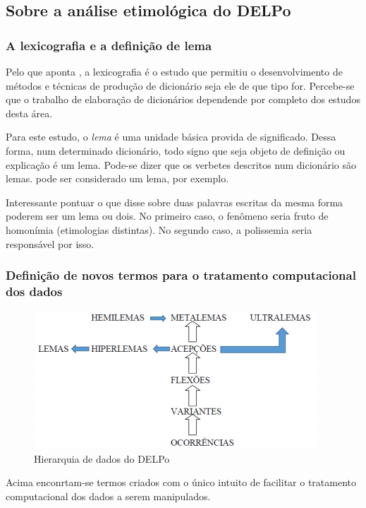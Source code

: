 \subsection{Sobre a análise etimológica do DELPo}
\label{subsec:analise-etimologica}

\subsubsection{A lexicografia e a definição de lema}
\label{subsubsec:lexicografia-lema}

Pelo que aponta \citep[p.~20]{Bar:14}, a lexicografia é o estudo que permitiu o
desenvolvimento de métodos e técnicas de produção de dicionário seja ele de que
tipo for. Percebe-se que o trabalho de elaboração de dicionários dependende por
completo dos estudos desta área.

Para este estudo, o \emph{lema} é uma unidade básica provida de significado.
Dessa forma, num determinado dicionário, todo signo que seja objeto de definição
ou explicação é um lema. Pode-se dizer que os verbetes descritos num dicionário
são lemas.  pode ser considerado um lema, por exemplo.

Interessante pontuar o que disse \citet[p.~146]{Mar:17} sobre duas palavras escritas
da mesma forma poderem ser um lema ou dois. No primeiro caso, o fenômeno seria
fruto de homonímia (etimologias distintas). No segundo caso, a polissemia seria
responsável por isso.

\subsubsection{Definição de novos termos para o tratamento computacional dos
dados}\label{subsubsec:tratamento-computacional-dos-dados}

\begin{figure}[ht]
    \centering
    \includegraphics[width=.5\textwidth]{figuras/dado_hierarquia_delpo.png}
    \caption{Hierarquia de dados do DELPo}
    \label{fig:dados-hierarquia}
\end{figure}

Acima enconrtam-se termos criados com o único intuito de facilitar o tratamento
computacional dos dados a serem manipulados.

